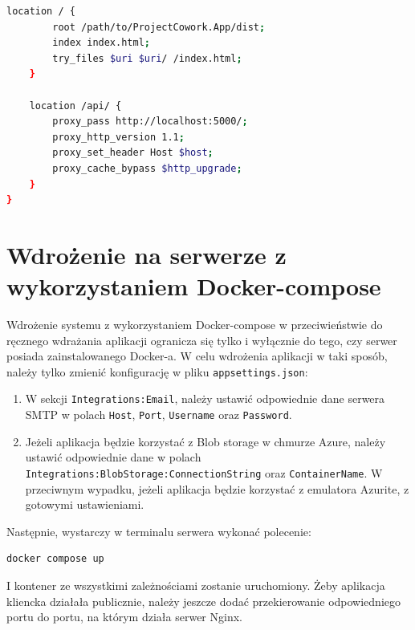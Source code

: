 \begin{enumerate}
\begin{lstlisting}[language=bash]
    location / {
        root /path/to/ProjectCowork.App/dist;
        index index.html;
        try_files $uri $uri/ /index.html;
    }

    location /api/ {
        proxy_pass http://localhost:5000/;
        proxy_http_version 1.1;
        proxy_set_header Host $host;
        proxy_cache_bypass $http_upgrade;
    }
}
    \end{lstlisting}
\end{enumerate}

\section{Wdrożenie na serwerze z wykorzystaniem Docker-compose}
Wdrożenie systemu z wykorzystaniem Docker-compose w przeciwieństwie do ręcznego wdrażania aplikacji ogranicza się tylko i wyłącznie do 
tego, czy serwer posiada zainstalowanego Docker-a.
W celu wdrożenia aplikacji w taki sposób, należy tylko zmienić konfigurację w pliku \texttt{appsettings.json}:
\begin{enumerate}
    \item W sekcji \texttt{Integrations:Email}, należy ustawić odpowiednie dane serwera SMTP w polach \texttt{Host}, \texttt{Port}, \texttt{Username} oraz \texttt{Password}.
    \item Jeżeli aplikacja będzie korzystać z Blob storage w chmurze Azure, należy ustawić odpowiednie dane w polach \texttt{Integrations:BlobStorage:ConnectionString} oraz \texttt{ContainerName}. W przeciwnym wypadku, jeżeli aplikacja będzie korzystać z emulatora Azurite, z gotowymi ustawieniami. 
\end{enumerate}
Następnie, wystarczy w terminalu serwera wykonać polecenie:
\begin{lstlisting}[language=bash]
    docker compose up
\end{lstlisting}
I kontener ze wszystkimi zależnościami zostanie uruchomiony. Żeby aplikacja kliencka działała publicznie, należy jeszcze dodać przekierowanie odpowiedniego portu do portu, na którym działa serwer Nginx.
